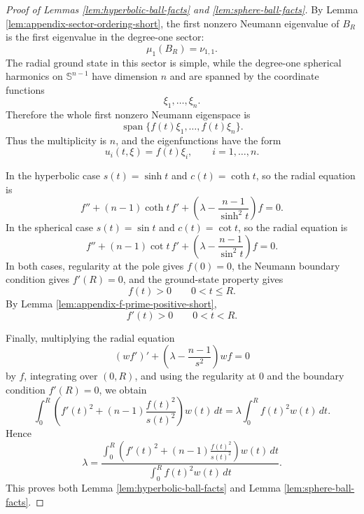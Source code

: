 \documentclass[11pt]{amsart}
\theoremstyle{remark}
\DeclareMathOperator{\spanop}{span}
\newcommand{\Sn}{\mathbb S}
\begin{document}
\begin{proof}[Proof of Lemmas \ref{lem:hyperbolic-ball-facts}
and \ref{lem:sphere-ball-facts}]
By Lemma \ref{lem:appendix-sector-ordering-short}, the first nonzero
Neumann eigenvalue of \(B_R\) is the first eigenvalue in the degree-one
sector:
$$
        \mu_1(B_R)=\nu_{1,1}.
$$
The radial ground state in this sector is simple, while the degree-one
spherical harmonics on \(\Sn^{n-1}\) have dimension \(n\) and are spanned by
the coordinate functions
$$
        \xi_1,\dots,\xi_n.
$$
Therefore the whole first nonzero Neumann eigenspace is
$$
        \spanop\{f(t)\xi_1,\dots,f(t)\xi_n\}.
$$
Thus the multiplicity is \(n\), and the eigenfunctions have the form
$$
        u_i(t,\xi)=f(t)\xi_i,
        \qquad i=1,\dots,n.
$$

In the hyperbolic case \(s(t)=\sinh t\) and \(c(t)=\coth t\), so the radial
equation is
$$
        f''+(n-1)\coth t\,f'
        +
        \left(\lambda-\frac{n-1}{\sinh^2t}\right)f=0.
$$
In the spherical case \(s(t)=\sin t\) and \(c(t)=\cot t\), so the radial
equation is
$$
        f''+(n-1)\cot t\,f'
        +
        \left(\lambda-\frac{n-1}{\sin^2t}\right)f=0.
$$
In both cases, regularity at the pole gives \(f(0)=0\), the Neumann boundary
condition gives \(f'(R)=0\), and the ground-state property gives
$$
        f(t)>0
        \qquad
        0<t\le R.
$$
By Lemma \ref{lem:appendix-f-prime-positive-short},
$$
        f'(t)>0
        \qquad
        0<t<R.
$$

Finally, multiplying the radial equation
$$
        (wf')'
        +
        \left(\lambda-\frac{n-1}{s^2}\right)wf
        =
        0
$$
by \(f\), integrating over \((0,R)\), and using the regularity at \(0\) and
the boundary condition \(f'(R)=0\), we obtain
$$
        \int_0^R
        \left(
        f'(t)^2+(n-1)\frac{f(t)^2}{s(t)^2}
        \right)w(t)\,dt
        =
        \lambda
        \int_0^R f(t)^2w(t)\,dt.
$$
Hence
$$
        \lambda
        =
        \frac{\displaystyle\int_0^R
        \left(
        f'(t)^2+(n-1)\frac{f(t)^2}{s(t)^2}
        \right)w(t)\,dt}
        {\displaystyle\int_0^R f(t)^2w(t)\,dt}.
$$
This proves both Lemma \ref{lem:hyperbolic-ball-facts} and Lemma
\ref{lem:sphere-ball-facts}.
\end{proof}
\end{document}
